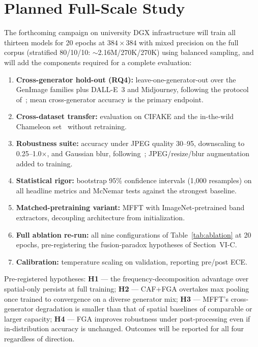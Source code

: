 \documentclass[journal]{IEEEtran}
\begin{document}
\section{Planned Full-Scale Study}
The forthcoming campaign on university DGX infrastructure will train all thirteen models for 20 epochs at $384\times384$ with mixed precision on the full corpus (stratified 80/10/10: $\sim$2.16M/270K/270K) using balanced sampling, and will add the components required for a complete evaluation:
\begin{enumerate}
    \item \textbf{Cross-generator hold-out (RQ4):} leave-one-generator-out over the GenImage families plus DALL-E~3 and Midjourney, following the protocol of~\cite{zhu2023genimage}; mean cross-generator accuracy is the primary endpoint.
    \item \textbf{Cross-dataset transfer:} evaluation on CIFAKE and the in-the-wild Chameleon set~\cite{yan2025sanity} without retraining.
    \item \textbf{Robustness suite:} accuracy under JPEG quality 30--95, downscaling to 0.25--1.0$\times$, and Gaussian blur, following~\cite{wang2020,corvi2023}; JPEG/resize/blur augmentation added to training.
    \item \textbf{Statistical rigor:} bootstrap 95\% confidence intervals (1{,}000 resamples) on all headline metrics and McNemar tests against the strongest baseline.
    \item \textbf{Matched-pretraining variant:} MFFT with ImageNet-pretrained band extractors, decoupling architecture from initialization.
    \item \textbf{Full ablation re-run:} all nine configurations of Table~\ref{tab:ablation} at 20 epochs, pre-registering the fusion-paradox hypotheses of Section~VI-C.
    \item \textbf{Calibration:} temperature scaling on validation, reporting pre/post ECE.
\end{enumerate}
Pre-registered hypotheses: \textbf{H1} --- the frequency-decomposition advantage over spatial-only persists at full training; \textbf{H2} --- CAF+FGA overtakes max pooling once trained to convergence on a diverse generator mix; \textbf{H3} --- MFFT's cross-generator degradation is smaller than that of spatial baselines of comparable or larger capacity; \textbf{H4} --- FGA improves robustness under post-processing even if in-distribution accuracy is unchanged. Outcomes will be reported for all four regardless of direction.
\end{document}
